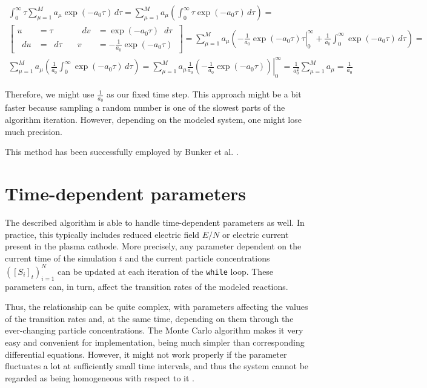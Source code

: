 \newcommand\diff{\mathop{}\!d}
\newcommand*\Eval[3]{\left.#1\right\rvert_{#2}^{#3}}

\begin{equation*}\begin{split}
    \int_0^\infty \tau \sum_{\mu = 1}^M a_\mu \exp{\left( -a_0 \tau \right)}\,d\tau =  
    \sum_{\mu = 1}^M a_\mu \left( \int_0^\infty \tau \exp{\left( -a_0 \tau \right)}\,d\tau \right) = \\
    \left[
          \begin{alignedat}{2}
          u       &= \tau            \quad & \diff v &= \exp{\left(-a_0\tau\right)}\diff\tau \\
          \diff u &= \diff\tau \quad & v &= -\frac{1}{a_0}\exp{\left(-a_0\tau\right)}
          \end{alignedat}\,
    \right] = 
    \sum_{\mu = 1}^M a_\mu \left( \Eval{-\frac{1}{a_0}\exp{\left(-a_0\tau\right)}\tau}{0}{\infty} + \frac{1}{a_0}\int_0^\infty\exp{\left(-a_0\tau\right)}\,d\tau \right) = \\
    \sum_{\mu = 1}^M a_\mu \left(\frac{1}{a_0}\int_0^\infty\exp{\left(-a_0\tau\right)}\,d\tau \right) =
    \sum_{\mu = 1}^M a_\mu \frac{1}{a_0} \Eval{\left(-\frac{1}{a_0}\exp{\left(-a_0\tau\right)}\right)}{0}{\infty} = 
    \frac{1}{a_0^2} \sum_{\mu = 1}^M a_\mu = \frac{1}{a_0}
\end{split}\end{equation*}

Therefore, we might use $\frac{1}{a_0}$ as our fixed time step. This approach might be a bit faster because sampling a random number is one of the slowest parts of the algorithm iteration. However, depending on the modeled system, one might lose much precision.

This method has been successfully employed by Bunker et al. \cite{bunker}.

\section{Time-dependent parameters}\label{section:dependent-parameters}

The described algorithm is able to handle time-dependent parameters as well. In practice, this typically includes reduced electric field $E/N$ or electric current present in the plasma cathode. More precisely, any parameter dependent on the current time of the simulation $t$ and the current particle concentrations $\left(\left[S_i\right]_t\right)_{i=1}^N$ can be updated at each iteration of the \verb|while| loop. These parameters can, in turn, affect the transition rates of the modeled reactions.

Thus, the relationship can be quite complex, with parameters affecting the values of the transition rates and, at the same time, depending on them through the ever-changing particle concentrations. The Monte Carlo algorithm makes it very easy and convenient for implementation, being much simpler than corresponding differential equations. However, it might not work properly if the parameter fluctuates a lot at sufficiently small time intervals, and thus the system cannot be regarded as being homogeneous with respect to it \cite{gillespie76}.

